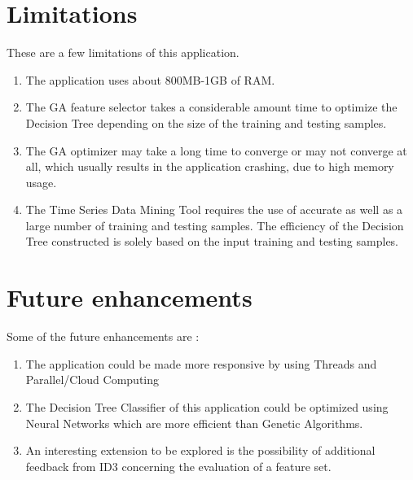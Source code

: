 \documentclass[12pt]{report}
\begin{document}
\section{Limitations}
These are a few limitations of this application.
\begin{enumerate}
\item{The application uses about 800MB-1GB of RAM.}

\item{The GA feature selector takes a considerable amount time to optimize the Decision Tree depending on the size of the training and testing samples.}
\item{The GA optimizer may take a long time to converge or may not converge at all, which usually results in the application crashing, due to high memory usage.}
\item{ The Time Series Data Mining Tool requires the use of accurate as well as a large number of training and testing samples. The efficiency of the Decision Tree constructed is solely based on the input training and testing samples.}

\end{enumerate}
\section{Future enhancements}
Some of the future enhancements are :
\begin{enumerate}
\item{The application could be made more responsive by using Threads and Parallel/Cloud Computing}
\item{The Decision Tree Classifier of this application could be optimized using Neural Networks which are more efficient than Genetic Algorithms.}
\item{An interesting extension to be explored is the possibility of
additional feedback from ID3 concerning the evaluation of a
feature set.}
\end{enumerate}
\end{document}
